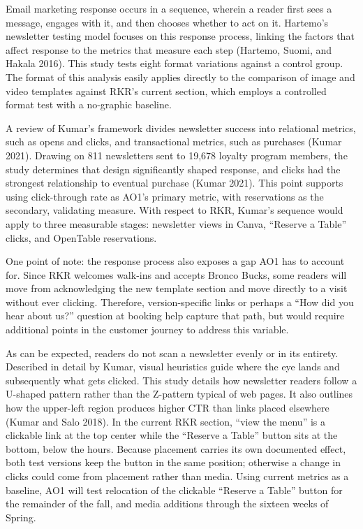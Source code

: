 \documentclass[
  12pt,
  letterpaper,
  DIV=11,
  numbers=noendperiod]{scrartcl}
\begin{document}
Email marketing response occurs in a sequence, wherein a reader first
sees a message, engages with it, and then chooses whether to act on it.
Hartemo's newsletter testing model focuses on this response process,
linking the factors that affect response to the metrics that measure
each step (Hartemo, Suomi, and Hakala 2016). This study tests eight
format variations against a control group. The format of this analysis
easily applies directly to the comparison of image and video templates
against RKR's current section, which employs a controlled format test
with a no-graphic baseline.

A review of Kumar's framework divides newsletter success into relational
metrics, such as opens and clicks, and transactional metrics, such as
purchases (Kumar 2021). Drawing on 811 newsletters sent to 19,678
loyalty program members, the study determines that design significantly
shaped response, and clicks had the strongest relationship to eventual
purchase (Kumar 2021). This point supports using click-through rate as
AO1's primary metric, with reservations as the secondary, validating
measure. With respect to RKR, Kumar's sequence would apply to three
measurable stages: newsletter views in Canva, ``Reserve a Table''
clicks, and OpenTable reservations.

One point of note: the response process also exposes a gap AO1 has to
account for. Since RKR welcomes walk-ins and accepts Bronco Bucks, some
readers will move from acknowledging the new template section and move
directly to a visit without ever clicking. Therefore, version-specific
links or perhaps a ``How did you hear about us?'' question at booking
help capture that path, but would require additional points in the
customer journey to address this variable.

As can be expected, readers do not scan a newsletter evenly or in its
entirety. Described in detail by Kumar, visual heuristics guide where
the eye lands and subsequently what gets clicked. This study details how
newsletter readers follow a U-shaped pattern rather than the Z-pattern
typical of web pages. It also outlines how the upper-left region
produces higher CTR than links placed elsewhere (Kumar and Salo 2018).
In the current RKR section, ``view the menu'' is a clickable link at the
top center while the ``Reserve a Table'' button sits at the bottom,
below the hours. Because placement carries its own documented effect,
both test versions keep the button in the same position; otherwise a
change in clicks could come from placement rather than media. Using
current metrics as a baseline, AO1 will test relocation of the clickable
``Reserve a Table'' button for the remainder of the fall, and media
additions through the sixteen weeks of Spring.
\end{document}

